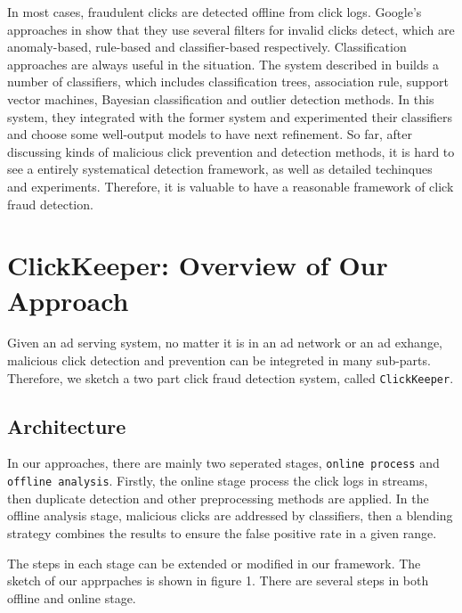 \documentclass[runningheads,report]{llncs}
\begin{document}
In most cases, fraudulent clicks are detected offline from click logs. Google's approaches in \cite{website:GoogleReport} show that they use several filters for invalid clicks detect, which are anomaly-based, rule-based and classifier-based respectively. Classification approaches are always useful in the situation. The system described in \cite{Martin:Thesis:2010} builds a number of classifiers, which includes classification trees, association rule, support vector machines, Bayesian classification and outlier detection methods. In this system, they integrated with the former system and experimented their classifiers and choose some well-output models to have next refinement. So far, after discussing kinds of malicious click prevention and detection methods, it is hard to see a entirely systematical detection framework, as well as detailed techinques and experiments. Therefore, it is valuable to have a reasonable framework of click fraud detection.


\section{ClickKeeper: Overview of Our Approach}
Given an ad serving system, no matter it is in an ad network or an ad exhange, malicious click detection and prevention can be integreted in many sub-parts. Therefore, we sketch a two part click fraud detection system, called \texttt{ClickKeeper}.

\subsection{Architecture}

In our approaches, there are mainly two seperated stages, \texttt{online process} and \texttt{offline analysis}. Firstly, the online stage process the click logs in streams, then duplicate detection and other preprocessing methods are applied. In the offline analysis stage, malicious clicks are addressed by classifiers, then a blending strategy combines the results to ensure the false positive rate in a given range.



The steps in each stage can be extended or modified in our framework. The sketch of our apprpaches is shown in figure 1. There are several steps in both offline and online stage. 
\end{document}
